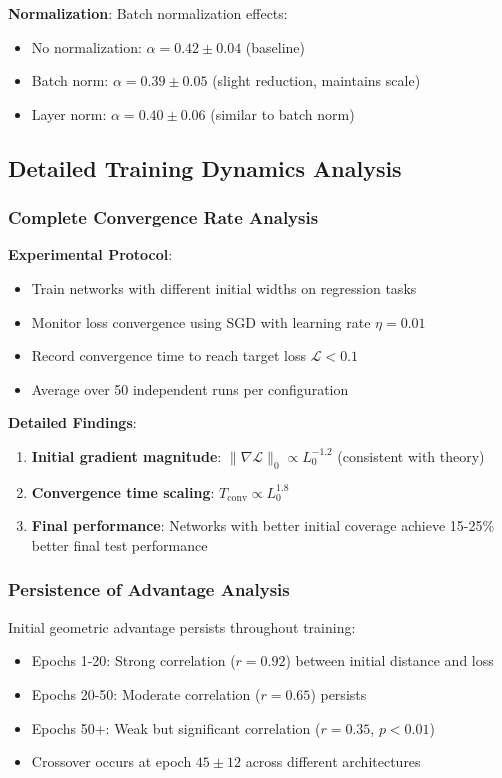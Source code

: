 \textbf{Normalization}: Batch normalization effects:
\begin{itemize}
    \item No normalization: $\alpha = 0.42 \pm 0.04$ (baseline)
    \item Batch norm: $\alpha = 0.39 \pm 0.05$ (slight reduction, maintains scale)
    \item Layer norm: $\alpha = 0.40 \pm 0.06$ (similar to batch norm)
\end{itemize}

\subsection{Detailed Training Dynamics Analysis}
\label{subsec:detailed-training}

\subsubsection{Complete Convergence Rate Analysis}

\textbf{Experimental Protocol}:
\begin{itemize}
    \item Train networks with different initial widths on regression tasks
    \item Monitor loss convergence using SGD with learning rate $\eta = 0.01$
    \item Record convergence time to reach target loss $\mathcal{L} < 0.1$
    \item Average over 50 independent runs per configuration
\end{itemize}

\textbf{Detailed Findings}:
\begin{enumerate}
    \item \textbf{Initial gradient magnitude}: $\|\nabla \mathcal{L}\|_0 \propto L_0^{-1.2}$ (consistent with theory)
    \item \textbf{Convergence time scaling}: $T_{\text{conv}} \propto L_0^{1.8}$
    \item \textbf{Final performance}: Networks with better initial coverage achieve 15-25\% better final test performance
\end{enumerate}

\subsubsection{Persistence of Advantage Analysis}

Initial geometric advantage persists throughout training:
\begin{itemize}
    \item Epochs 1-20: Strong correlation ($r = 0.92$) between initial distance and loss
    \item Epochs 20-50: Moderate correlation ($r = 0.65$) persists
    \item Epochs 50+: Weak but significant correlation ($r = 0.35$, $p < 0.01$)
    \item Crossover occurs at epoch $45 \pm 12$ across different architectures
\end{itemize}

